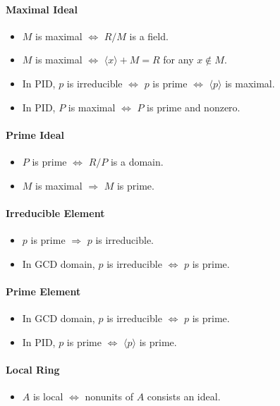 \documentclass{article}
\begin{document}
\paragraph*{Maximal Ideal}
\begin{itemize}
    \item $M$ is maximal $\Leftrightarrow$ $R/M$ is a field.
    \item $M$ is maximal $\Leftrightarrow$ $\langle x \rangle + M = R$ for any $x\notin M$.
    \item In PID, $p$ is irreducible $\Leftrightarrow$ $p$ is prime $\Leftrightarrow$ $\langle p \rangle$ is maximal.
    \item In PID, $P$ is maximal $\Leftrightarrow$ $P$ is prime and nonzero.
\end{itemize}

\paragraph*{Prime Ideal}
\begin{itemize}
    \item $P$ is prime $\Leftrightarrow$ $R/P$ is a domain.
    \item $M$ is maximal $\Rightarrow$ $M$ is prime.
\end{itemize}

\paragraph*{Irreducible Element}
\begin{itemize}
    \item $p$ is prime $\Rightarrow$ $p$ is irreducible.
    \item In GCD domain, $p$ is irreducible $\Leftrightarrow$ $p$ is prime.
\end{itemize}

\paragraph*{Prime Element}
\begin{itemize}
    \item In GCD domain, $p$ is irreducible $\Leftrightarrow$ $p$ is prime.
    \item In PID, $p$ is prime $\Leftrightarrow$ $\langle p \rangle$ is prime.
\end{itemize}

\paragraph*{Local Ring}
\begin{itemize}
    \item $A$ is local $\Leftrightarrow$ nonunits of $A$ consists an ideal.
\end{itemize}
\end{document}
